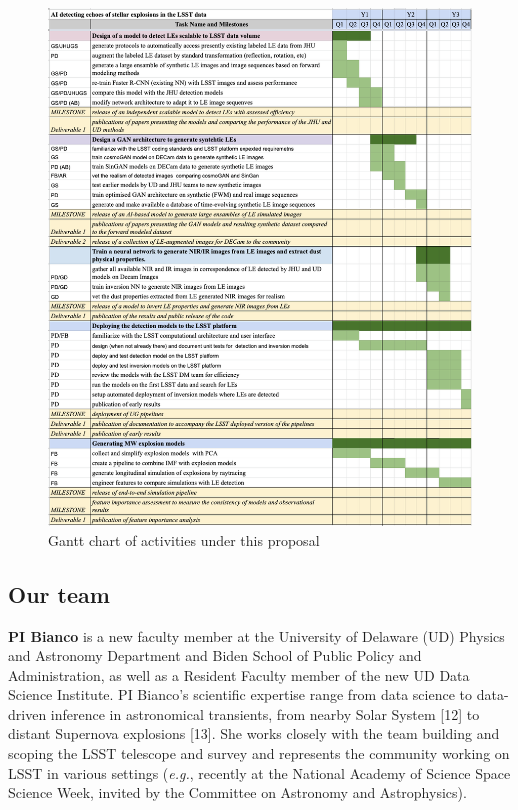 \documentclass{proposalnsf}
\newcommand{\eg}{\emph{e.g.}}
\begin{document}
\begin{figure}[htp]
    \centering
    \includegraphics[]{gantt.png}
    \caption{Gantt chart of activities under this proposal}
    \label{fig:gannt}
\end{figure}
 

\subsection{Our team}

{\bf PI Bianco} is a new faculty member at the University of Delaware (UD) Physics and Astronomy Department and Biden School of Public Policy and Administration,  as well as a Resident Faculty member of the new UD Data Science Institute. PI Bianco’s scientific expertise range from data science to data-driven inference in astronomical transients, from nearby Solar System [12] to distant Supernova explosions [13].   She works closely with the team building and scoping the LSST telescope and survey and represents the community working on LSST in various settings (\eg,  recently at the National Academy of Science Space Science Week, invited by the Committee on Astronomy and Astrophysics).  
\end{document}
